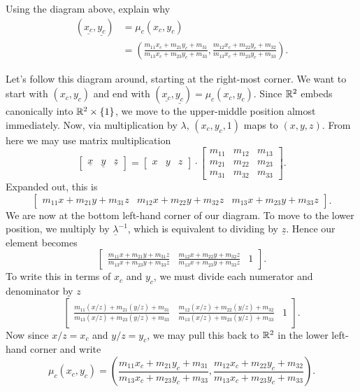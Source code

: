 \documentclass{ximera}
\begin{document}
\begin{problem}
  Using the diagram above, explain why
  \begin{align*}
(\underline{x_{c}},\underline{y_{c}})  &= \mu_{c}(x_{c},y_{c}) \\
  & =\left(\frac{m_{11}x_{c}+m_{21}y_{c}+m_{31}}{m_{13}x_{c}+m_{23}y_{c}+m_{33}},
  \frac{m_{12}x_{c}+m_{22}y_{c}+m_{32}}{m_{13}x_{c}+m_{23}y_{c}+m_{33}
}\right).
  \end{align*}
  \begin{freeResponse}
    Let's follow this diagram around, starting at the right-most
    corner. We want to start with $(x_c,y_c)$ and end with
    $(\underline{x_c},\underline{y_c}) = \mu_c(x_c,y_c)$. Since $\mathbb R^2$
    embeds canonically into $\mathbb R^2\times\{1\}$, we move to the
    upper-middle position almost immediately. Now, via multiplication
    by $\lambda$, $(x_c,y_c,1)$ maps to $(x,y,z)$. From here we may use
    matrix multiplication
    \[
    \begin{bmatrix}
      \underline{x} & \underline{y} & \underline{z}
    \end{bmatrix}
    =
    \begin{bmatrix}
    x & y & z
    \end{bmatrix}
    \cdot\begin{bmatrix}
    m_{11} & m_{12} & m_{13}\\
    m_{21} & m_{22} & m_{23}\\
    m_{31} & m_{32} & m_{33}
    \end{bmatrix}.
    \]
    Expanded out, this is
    \[
    \begin{bmatrix}
      m_{11}x+m_{21}y+m_{31}z & m_{12}x+m_{22}y+m_{32}z & 
      m_{13}x+m_{23}y+m_{33}z
    \end{bmatrix}.
    \]
    We are now at the bottom left-hand corner of our diagram. To move
    to the lower position, we multiply by $\underline{\lambda}^{-1}$, which
    is equivalent to dividing by $\underline{z}$. Hence our element
    becomes
     \[
    \begin{bmatrix}
      \frac{m_{11}x+m_{21}y+m_{31}z}{m_{13}x+m_{23}y+m_{33}z} &
      \frac{m_{12}x+m_{22}y+m_{32}z}{m_{13}x+m_{23}y+m_{33}z} & 1
    \end{bmatrix}.
    \]
    To write this in terms of $x_c$ and $y_c$, we must divide each
    numerator and denominator by $z$
    \[
    \begin{bmatrix}
      \frac{m_{11}(x/z)+m_{21}(y/z)+m_{31}}{m_{13}(x/z)+m_{23}(y/z)+m_{33}}
      &
      \frac{m_{12}(x/z)+m_{22}(y/z)+m_{32}}{m_{13}(x/z)+m_{23}(y/z)+m_{33}}
      & 1
    \end{bmatrix}.
    \]
    Now since $x/z = x_c$ and $y/z =y_c$, we may pull this back to
    $\mathbb R^2$ in the lower left-hand corner and write
    \[
    \mu_c(x_c,y_c) = \left(
    \frac{m_{11}x_c+m_{21}y_c+m_{31}}{m_{13}x_c+m_{23}y_c+m_{33}},
    \frac{m_{12}x_c+m_{22}y_c+m_{32}}{m_{13}x_c+m_{23}y_c+m_{33}}
    \right).
    \]
  \end{freeResponse}
\end{problem}
\end{document}
